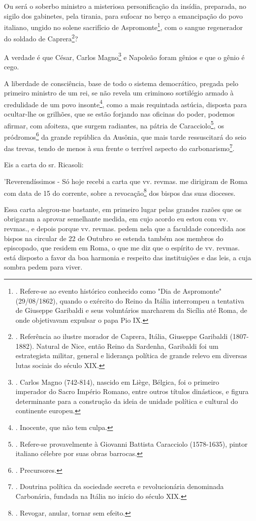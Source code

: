 Ou será o soberbo ministro a misteriosa personificação da insídia,
preparada, no sigilo dos gabinetes, pela tirania, para sufocar no berço
a emancipação do povo italiano, ungido no solene sacrifício de
Aspromonte\footnote{. Refere-se ao evento histórico conhecido como "Dia
  de Aspromonte" (29/08/1862), quando o exército do Reino da Itália
  interrompeu a tentativa de Giuseppe Garibaldi e seus voluntários
  marcharem da Sicília até Roma, de onde objetivavam expulsar o papa Pio
  IX.}, com o sangue regenerador do soldado de Caprera\footnote{.
  Referência ao ilustre morador de Caprera, Itália, Giuseppe Garibaldi
  (1807-1882). Natural de Nice, então Reino da Sardenha, Garibaldi foi
  um estrategista militar, general e liderança política de grande relevo
  em diversas lutas sociais do século XIX.}?

A verdade é que César, Carlos Magno\footnote{. Carlos Magno (742-814),
  nascido em Liège, Bélgica, foi o primeiro imperador do Sacro Império
  Romano, entre outros títulos dinásticos, e figura determinante para a
  construção da ideia de unidade política e cultural do continente
  europeu.} e Napoleão foram gênios e que o gênio é cego.

A liberdade de consciência, base de todo o sistema democrático, pregada
pelo primeiro ministro de um rei, se não revela um criminoso sortilégio
armado à credulidade de um povo insonte\footnote{. Inocente, que não tem
  culpa.}, como a mais requintada astúcia, disposta para ocultar-lhe os
grilhões, que se estão forjando nas oficinas do poder, podemos afirmar,
com afoiteza, que surgem radiantes, na pátria de Caracciolo\footnote{.
  Refere-se provavelmente à Giovanni Battista Caracciolo (1578-1635),
  pintor italiano célebre por suas obras barrocas.}, os
pródromos\footnote{. Precursores.} da grande república da Ausônia, que
mais tarde ressuscitará do seio das trevas, tendo de menos à sua frente
o terrível aspecto do carbonarismo\footnote{. Doutrina política da
  sociedade secreta e revolucionária denominada Carbonária, fundada na
  Itália no início do século XIX.}.

Eis a carta do sr. Ricasoli:

'Reverendíssimos - Só hoje recebi a carta que vv. revmas. me dirigiram
de Roma com data de 15 do corrente, sobre a revocação\footnote{.
  Revogar, anular, tornar sem efeito.} dos bispos das suas dioceses.

Essa carta alegrou-me bastante, em primeiro lugar pelas grandes razões
que os obrigaram a aprovar semelhante medida, em cujo acordo eu estou
com vv. revmas., e depois porque vv. revmas. pedem nela que a faculdade
concedida aos bispos na circular de 22 de Outubro se estenda também aos
membros do episcopado, que residem em Roma, o que me diz que o espírito
de vv. revmas. está disposto a favor da boa harmonia e respeito das
instituições e das leis, a cuja sombra pedem para viver.

